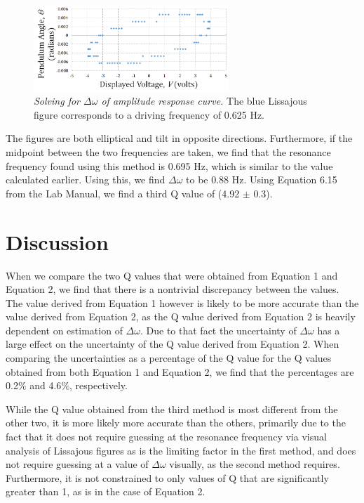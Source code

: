 \documentclass[twoside,twocolumn]{article}
\begin{document}
\begin{figure}[!htbp]
    \centering
    \includegraphics[width=2.9in]{FreqBelow.png}
    \caption{\textit{Solving for $\Delta \omega$ of amplitude response curve.} The blue Lissajous figure corresponds to a driving frequency of 0.625 Hz.}
\end{figure}

\noindent The figures are both elliptical and tilt in opposite directions. Furthermore, if the midpoint between the two frequencies are taken, we find that the resonance frequency found using this method is 0.695 Hz, which is similar to the value calculated earlier. Using this, we find $\Delta \omega$ to be 0.88 Hz. Using Equation 6.15 from the Lab Manual, we find a third Q value of (4.92 $\pm$ 0.3).


\section{Discussion}

\noindent When we compare the two Q values that were obtained from Equation 1 and Equation 2, we find that there is a nontrivial discrepancy between the values. The value derived from Equation 1 however is likely to be more accurate than the value derived from Equation 2, as the Q value derived from Equation 2 is heavily dependent on estimation of $\Delta \omega$. Due to that fact the uncertainty of $\Delta \omega$ has a large effect on the uncertainty of the Q value derived from Equation 2. When comparing the uncertainties as a percentage of the Q value for the Q values obtained from both Equation 1 and Equation 2, we find that the percentages are 0.2$\%$ and 4.6$\%$, respectively.

\hfill

\noindent While the Q value obtained from the third method is most different from the other two, it is more likely more accurate than the others, primarily due to the fact that it does not require guessing at the resonance frequency via visual analysis of Lissajous figures as is the limiting factor in the first method, and does not require guessing at a value of $\Delta \omega$ visually, as the second method requires. Furthermore, it is not constrained to only values of Q that are significantly greater than 1, as is in the case of Equation 2.
\end{document}
